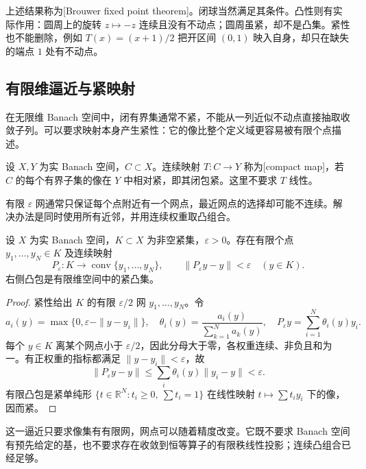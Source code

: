 上述结果称为[Brouwer fixed point theorem]。闭球当然满足其条件。凸性则有实际作用：圆周上的旋转 \(z\mapsto-z\) 连续且没有不动点；圆周虽紧，却不是凸集。紧性也不能删除，例如 \(T(x)=(x+1)/2\) 把开区间 \((0,1)\) 映入自身，却只在缺失的端点 \(1\) 处有不动点。

\subsection{有限维逼近与紧映射}
\label{b2:subsec:H20302}

在无限维 Banach 空间中，闭有界集通常不紧，不能从一列近似不动点直接抽取收敛子列。可以要求映射本身产生紧性：它的像比整个定义域更容易被有限个点描述。

\begin{definition}[紧映射]
\label{b2:def:H3-compact-map}
设 \(X,Y\) 为实 Banach 空间，\(C\subset X\)。连续映射 \(T:C\to Y\) 称为[compact map]，若 \(C\) 的每个有界子集的像在 \(Y\) 中相对紧，即其闭包紧。这里不要求 \(T\) 线性。
\end{definition}

有限 \(\varepsilon\) 网通常只保证每个点附近有一个网点，最近网点的选择却可能不连续。解决办法是同时使用所有近邻，并用连续权重取凸组合。

\begin{lemma}[紧集的连续有限维逼近]
\label{b2:lem:H3-finite-approximation}
设 \(X\) 为实 Banach 空间，\(K\subset X\) 为非空紧集，\(\varepsilon>0\)。存在有限个点 \(y_1,\ldots,y_N\in K\) 及连续映射
\[
 P_\varepsilon:K\longrightarrow\operatorname{conv}\{y_1,\ldots,y_N\},
 \qquad\|P_\varepsilon y-y\|<\varepsilon\quad(y\in K).
\]
右侧凸包是有限维空间中的紧凸集。
\end{lemma}
\begin{proof}
紧性给出 \(K\) 的有限 \(\varepsilon/2\) 网 \(y_1,\ldots,y_N\)。令
\[
 a_i(y)=\max\{0,\varepsilon-\|y-y_i\|\},\quad
 \theta_i(y)=\frac{a_i(y)}{\sum_{k=1}^N a_k(y)},\quad
 P_\varepsilon y=\sum_{i=1}^N\theta_i(y)y_i.
\]
每个 \(y\in K\) 离某个网点小于 \(\varepsilon/2\)，因此分母大于零，各权重连续、非负且和为一。有正权重的指标都满足 \(\|y-y_i\|<\varepsilon\)，故
\[
 \|P_\varepsilon y-y\|\le\sum_i\theta_i(y)\|y_i-y\|<\varepsilon.
\]
有限凸包是紧单纯形 \(\{t\in\mathbb R^N:t_i\ge0,\ \sum t_i=1\}\) 在线性映射 \(t\mapsto\sum t_i y_i\) 下的像，因而紧。
\end{proof}

这一逼近只要求像集有有限网，网点可以随着精度改变。它既不要求 Banach 空间有预先给定的基，也不要求存在收敛到恒等算子的有限秩线性投影；连续凸组合已经足够。

